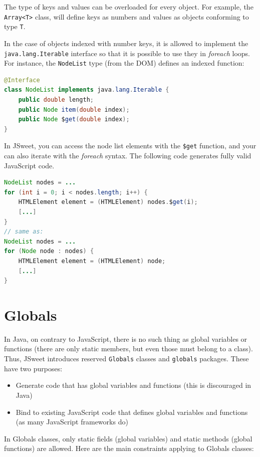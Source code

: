 \documentclass[a4paper]{report}
\begin{document}
The type of keys and values can be overloaded for every object. For example, the \texttt{Array<T>} class, will define keys as numbers and values as objects conforming to type \texttt{T}.

In the case of objects indexed with number keys, it is allowed to implement the \texttt{java.lang.Iterable} interface so that it is possible to use they in \emph{foreach} loops. For instance, the \texttt{NodeList} type (from the DOM) defines an indexed function:

\begin{lstlisting}[language=Java]
@Interface
class NodeList implements java.lang.Iterable {
    public double length;
    public Node item(double index);
    public Node $get(double index);
}
\end{lstlisting}

In JSweet, you can access the node list elements with the \texttt{\$get} function, and your can also iterate with the \emph{foreach} syntax. The following code generates fully valid JavaScript code.

\begin{lstlisting}[language=Java]
NodeList nodes = ...
for (int i = 0; i < nodes.length; i++) {
	HTMLElement element = (HTMLElement) nodes.$get(i);
	[...]
}
// same as:
NodeList nodes = ...
for (Node node : nodes) {
	HTMLElement element = (HTMLElement) node;
	[...]
}
\end{lstlisting}

\section{Globals}

In Java, on contrary to JavaScript, there is no such thing as global variables or functions (there are only static members, but even those must belong to a class). Thus, JSweet introduces reserved \texttt{Globals} classes and \texttt{globals} packages. These have two purposes:

\begin{itemize}
\item Generate code that has global variables and functions (this is discouraged in Java)
\item Bind to existing JavaScript code that defines global variables and functions (as many JavaScript frameworks do)
\end{itemize}

In Globals classes, only static fields (global variables) and static methods (global functions) are allowed. Here are the main constraints applying to Globals classes:
\end{document}
